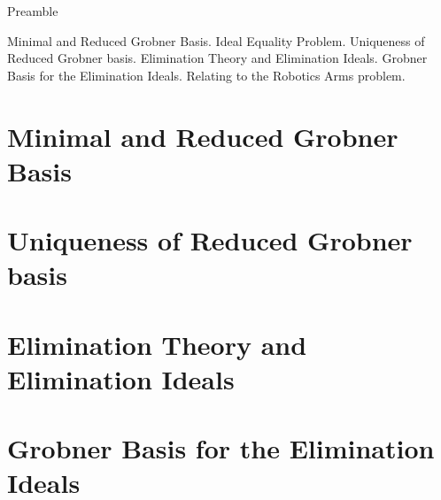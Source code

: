
\noindent
Preamble

Minimal and Reduced Grobner Basis. Ideal Equality Problem. Uniqueness of Reduced Grobner basis. Elimination Theory and Elimination Ideals. Grobner Basis for the Elimination Ideals. Relating to the Robotics Arms problem.


\section{Minimal and Reduced Grobner Basis}

\section{Uniqueness of Reduced Grobner basis}

\section{Elimination Theory and Elimination Ideals}

\section{Grobner Basis for the Elimination Ideals}
